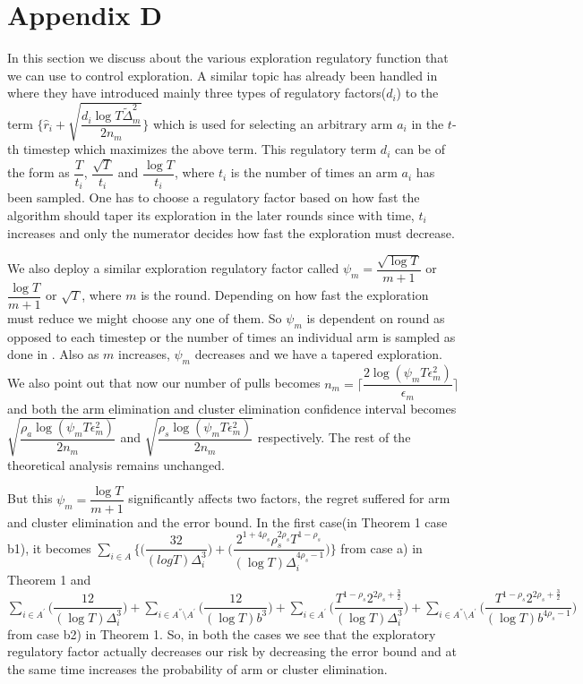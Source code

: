 \section{Appendix D}

In this section we discuss about the various exploration regulatory function that we can use to control exploration. A similar topic has already been handled in \cite{liu2016modification} where they have introduced mainly three types of regulatory factors($d_{i}$) to the term $\bigg\lbrace\hat{r}_{i}+\sqrt{\dfrac{d_{i}\log T\tilde{\Delta}_{m}^{2}}{2n_{m}}}\bigg\rbrace$ which is used for selecting an arbitrary arm $a_{i}$ in the $t$-th timestep which maximizes the above term. This regulatory term $d_{i}$ can be of the form as $\dfrac{T}{t_{i}}$, $\dfrac{\sqrt{T}}{t_{i}}$ and $\dfrac{\log T}{t_{i}}$, where $t_{i}$ is the number of times an arm $a_{i}$ has been sampled. One has to choose a regulatory factor based on how fast the algorithm should taper its exploration in the later rounds since with time, $t_{i}$ increases and only the numerator decides how fast the exploration must decrease.

	We also deploy a similar exploration regulatory factor called $\psi_{m}=\dfrac{\sqrt{\log T}}{m+1}$ or $\dfrac{\log T}{m+1}$ or $\sqrt{T}$, where $m$ is the round. Depending on how fast the exploration must reduce we might choose any one of them. So $\psi_{m}$ is dependent on round as opposed to each timestep or the number of times an individual arm is sampled as done in \cite{liu2016modification}. Also as $m$ increases, $\psi_{m}$ decreases and we have a tapered exploration. We also point out that now our number of pulls becomes $n_{m}=\bigg\lceil\dfrac{2\log{(\psi_{m}T\epsilon_{m}^{2})}}{\epsilon_{m}}\bigg\rceil$ and both the arm elimination and cluster elimination confidence interval becomes $\sqrt{\dfrac{\rho_{a}\log{(\psi_{m}T\epsilon_{m}^{2})}}{2 n_{m}}}$ and $\sqrt{\dfrac{\rho_{s} \log{(\psi_{m}T\epsilon_{m}^{2})}}{2 n_{m}}}$  respectively. The rest of the theoretical analysis remains unchanged. 
	
	But this $\psi_{m}=\dfrac{\log T}{m+1}$ significantly affects two factors, the regret suffered for arm and cluster elimination and the error bound. In the first case(in Theorem 1 case b1), it becomes $ \sum_{i\in A}\bigg\lbrace\bigg(\dfrac{32}{(log T)\Delta_{i}^{3}}\bigg) + \bigg(\dfrac{2^{1+4\rho_{s}}\rho_{s}^{2\rho_{s}}T^{1-\rho_{s}}}{(\log T)\Delta_{i}^{4\rho_{s}-1}}\bigg)\bigg\rbrace$ from case a) in Theorem 1 and $\sum_{i\in A^{'}}\bigg(\dfrac{12}{(\log T)\Delta_{i}^{3}} \bigg)+\sum_{i\in A^{''}\setminus A^{'}}\bigg(\dfrac{12}{(\log T) b^{3}} \bigg) + \sum_{i\in A^{'}}\bigg(\dfrac{T^{1-\rho_{s}}2^{2\rho_{s}+\frac{3}{2}}}{(\log T) \Delta_{i}^{3}} \bigg)+\sum_{i\in A^{''}\setminus A^{'}}\bigg(\dfrac{T^{1-\rho_{s}}2^{2\rho_{s}+\frac{3}{2}}}{(\log T) b^{4\rho_{s} -1}} \bigg)$ from case b2) in Theorem 1. So, in both the cases we see that the exploratory regulatory factor actually decreases our risk by decreasing the error bound and at the same time increases the probability of arm or cluster elimination. 
	
